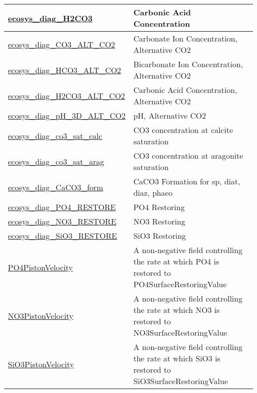 {\begin{center}
\begin{longtable}{| p{2.0in} | p{4.0in} |}
    \hline
    \hyperref[subsec:var_sec_forcing_ecosys_diag_H2CO3]{ecosys\_diag\_H2CO3} & Carbonic Acid Concentration \\
    \hline
    \hyperref[subsec:var_sec_forcing_ecosys_diag_CO3_ALT_CO2]{ecosys\_diag\_CO3\_ALT\_CO2} & Carbonate Ion Concentration, Alternative CO2 \\
    \hline
    \hyperref[subsec:var_sec_forcing_ecosys_diag_HCO3_ALT_CO2]{ecosys\_diag\_HCO3\_ALT\_CO2} & Bicarbonate Ion Concentration, Alternative CO2 \\
    \hline
    \hyperref[subsec:var_sec_forcing_ecosys_diag_H2CO3_ALT_CO2]{ecosys\_diag\_H2CO3\_ALT\_\-CO2} & Carbonic Acid Concentration, Alternative CO2 \\
    \hline
    \hyperref[subsec:var_sec_forcing_ecosys_diag_pH_3D_ALT_CO2]{ecosys\_diag\_pH\_3D\_ALT\_\-CO2} & pH, Alternative CO2 \\
    \hline
    \hyperref[subsec:var_sec_forcing_ecosys_diag_co3_sat_calc]{ecosys\_diag\_co3\_sat\_calc} & CO3 concentration at calcite saturation \\
    \hline
    \hyperref[subsec:var_sec_forcing_ecosys_diag_co3_sat_arag]{ecosys\_diag\_co3\_sat\_arag} & CO3 concentration at aragonite saturation \\
    \hline
    \hyperref[subsec:var_sec_forcing_ecosys_diag_CaCO3_form]{ecosys\_diag\_CaCO3\_form} & CaCO3 Formation for sp, diat, diaz, phaeo \\
    \hline
    \hyperref[subsec:var_sec_forcing_ecosys_diag_PO4_RESTORE]{ecosys\_diag\_PO4\_RESTORE} & PO4 Restoring \\
    \hline
    \hyperref[subsec:var_sec_forcing_ecosys_diag_NO3_RESTORE]{ecosys\_diag\_NO3\_RESTORE} & NO3 Restoring \\
    \hline
    \hyperref[subsec:var_sec_forcing_ecosys_diag_SiO3_RESTORE]{ecosys\_diag\_SiO3\_RESTORE} & SiO3 Restoring \\
    \hline
    \hyperref[subsec:var_sec_forcing_PO4PistonVelocity]{PO4PistonVelocity} & A non-negative field controlling the rate at which PO4 is restored to PO4SurfaceRestoringValue \\
    \hline
    \hyperref[subsec:var_sec_forcing_NO3PistonVelocity]{NO3PistonVelocity} & A non-negative field controlling the rate at which NO3 is restored to NO3SurfaceRestoringValue \\
    \hline
    \hyperref[subsec:var_sec_forcing_SiO3PistonVelocity]{SiO3PistonVelocity} & A non-negative field controlling the rate at which SiO3 is restored to SiO3SurfaceRestoringValue \\

\end{longtable}
\end{center}}
